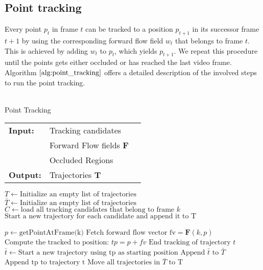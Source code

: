 \subsection{Point tracking}
Every point $p_t$ in frame $t$ can be tracked to a position $p_{t+1}$ in its successor frame $t+1$ by using the corresponding forward flow field $w_t$ that belongs to frame $t$. This is achieved by adding $w_t$ to $p_t$, which yields $p_{t+1}$. We repeat this procedure until the points gets either occluded or has reached the last video frame. Algorithm $\ref{alg:point_tracking}$ offers a detailed description of the involved steps to run the point tracking. \\ \\
\begin{algorithm}[H]
\caption{Point Tracking}
\begin{table}[H]
  \begin{tabular}{@{}lll@{}}
    \textbf{Input:} & Tracking candidates \\
    	& Forward Flow fields $\textbf{F}$ \\
        & Occluded Regions \\
	\textbf{Output:} & Trajectories $\textbf{T}$
  \end{tabular} 
\end{table}
\setlength{\fboxrule}{0pt} 
\begin{boxedminipage}{1.0\textwidth}
  \begin{algorithmic}[1]
  	\State $T \leftarrow \text{Initialize an empty list of trajectories}$
  	\State $\bar{T} \leftarrow \text{Initialize an empty list of trajectories}$
  		\State $C \leftarrow \text{load all tracking candidates that belong to frame } k$
  		\State $\text{Start a new trajectory for each candidate and append it to T}$

  			\State $p \leftarrow \text{getPointAtFrame(k)}$
  		  	\State $\text{Fetch forward flow vector fv} = \textbf{F} \left(k, p \right)$
  			\State $\text{Compute the tracked to position: } tp = p + fv$
  				\State $\text{End tracking of trajectory } t $
  				\State $\bar{t} \leftarrow \text{Start a new trajectory using tp as starting position}$
  				\State $\text{Append } \bar{t} \text{ to } \bar{T}$
  			\Else 
  				\State $\text{Append tp to trajectory t}$
  			\EndIf
  		\EndFor
  		\State $\text{Move all trajectories in } \bar{T} \text{ to T}$
    \EndFor
  \end{algorithmic}
  \end{boxedminipage}
  \vskip1.5pt
\label{alg:point_tracking}
\end{algorithm}
